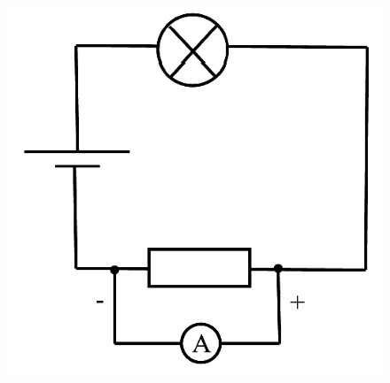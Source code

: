 \begin{enumerate}[noitemsep, label=\textbf{\arabic*}. ]
	\begin{figure}[H] %
    \begin{center}
    \label{m38776*id6854!!!underscore!!!media}\label{m38776*id6854!!!underscore!!!printimage}\includegraphics{col11305.imgs/m38776_circuit1.png} %
        
      \vspace{2pt}
    \vspace{.1in}
    
    \end{center}

 \end{figure}   

    \addtocounter{footnote}{-0}
             

\end{enumerate}
